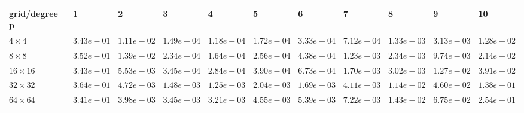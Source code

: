 \begin{tabular}{lllllllllll}
\hline
 grid/degree p   & 1          & 2          & 3          & 4          & 5          & 6          & 7          & 8          & 9          & 10         \\
\hline
 $4 \times 4$    & $3.43e-01$ & $1.11e-02$ & $1.49e-04$ & $1.18e-04$ & $1.72e-04$ & $3.33e-04$ & $7.12e-04$ & $1.33e-03$ & $3.13e-03$ & $1.28e-02$ \\
 $8 \times 8$    & $3.52e-01$ & $1.39e-02$ & $2.34e-04$ & $1.64e-04$ & $2.56e-04$ & $4.38e-04$ & $1.23e-03$ & $2.34e-03$ & $9.74e-03$ & $2.14e-02$ \\
 $16 \times 16$  & $3.43e-01$ & $5.53e-03$ & $3.45e-04$ & $2.84e-04$ & $3.90e-04$ & $6.73e-04$ & $1.70e-03$ & $3.02e-03$ & $1.27e-02$ & $3.91e-02$ \\
 $32 \times 32$  & $3.64e-01$ & $4.72e-03$ & $1.48e-03$ & $1.25e-03$ & $2.04e-03$ & $1.69e-03$ & $4.11e-03$ & $1.14e-02$ & $4.60e-02$ & $1.38e-01$ \\
 $64 \times 64$  & $3.41e-01$ & $3.98e-03$ & $3.45e-03$ & $3.21e-03$ & $4.55e-03$ & $5.39e-03$ & $7.22e-03$ & $1.43e-02$ & $6.75e-02$ & $2.54e-01$ \\
\hline
\end{tabular}